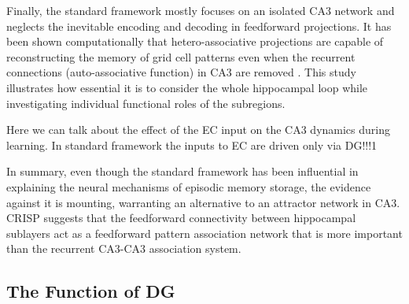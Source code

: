 \documentclass[utf8]{frontiersSCNS} %
\begin{document}
Finally, the standard framework mostly focuses on an isolated CA3 network and neglects the inevitable encoding and decoding in feedforward projections. It has been shown computationally that hetero-associative projections are capable of reconstructing the memory of grid cell patterns even when the recurrent connections (auto-associative function) in CA3 are removed \cite{neher2015memory}. This study illustrates how essential it is to consider the whole hippocampal loop while investigating individual functional roles of the subregions. 

Here we can talk about the effect of the EC input on the CA3 dynamics during learning. In standard framework the inputs to EC are driven only via DG!!!1 




In summary, even though the standard framework has been influential in explaining the neural mechanisms of episodic memory storage, the evidence against it is mounting, warranting an alternative to an attractor network in CA3. CRISP suggests that the feedforward connectivity between hippocampal sublayers act as a feedforward pattern association network that is more important than the recurrent CA3-CA3 association system. 



\subsection{The Function of DG}
\end{document}

